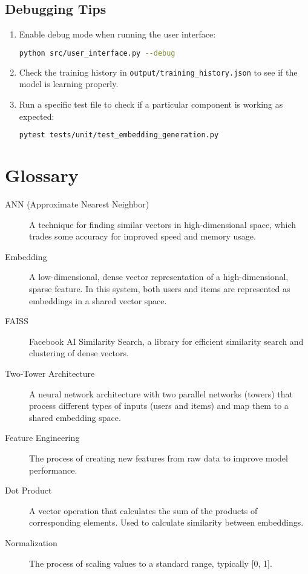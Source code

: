 \documentclass[12pt, a4paper, oneside]{book}
\begin{document}
\section{Debugging Tips}
\begin{enumerate}
    \item Enable debug mode when running the user interface:
    \begin{lstlisting}[language=bash]
python src/user_interface.py --debug
    \end{lstlisting}

    \item Check the training history in \texttt{output/training\_history.json} to see if the model is learning properly.

    \item Run a specific test file to check if a particular component is working as expected:
    \begin{lstlisting}[language=bash]
pytest tests/unit/test_embedding_generation.py
    \end{lstlisting}
\end{enumerate}

\appendix

\chapter{Glossary}

\begin{description}
    \item[ANN (Approximate Nearest Neighbor)] A technique for finding similar vectors in high-dimensional space, which trades some accuracy for improved speed and memory usage.
    
    \item[Embedding] A low-dimensional, dense vector representation of a high-dimensional, sparse feature. In this system, both users and items are represented as embeddings in a shared vector space.
    
    \item[FAISS] Facebook AI Similarity Search, a library for efficient similarity search and clustering of dense vectors.
    
    \item[Two-Tower Architecture] A neural network architecture with two parallel networks (towers) that process different types of inputs (users and items) and map them to a shared embedding space.
    
    \item[Feature Engineering] The process of creating new features from raw data to improve model performance.
    
    \item[Dot Product] A vector operation that calculates the sum of the products of corresponding elements. Used to calculate similarity between embeddings.
    
    \item[Normalization] The process of scaling values to a standard range, typically [0, 1].
    
\end{description}

\backmatter
\end{document}
